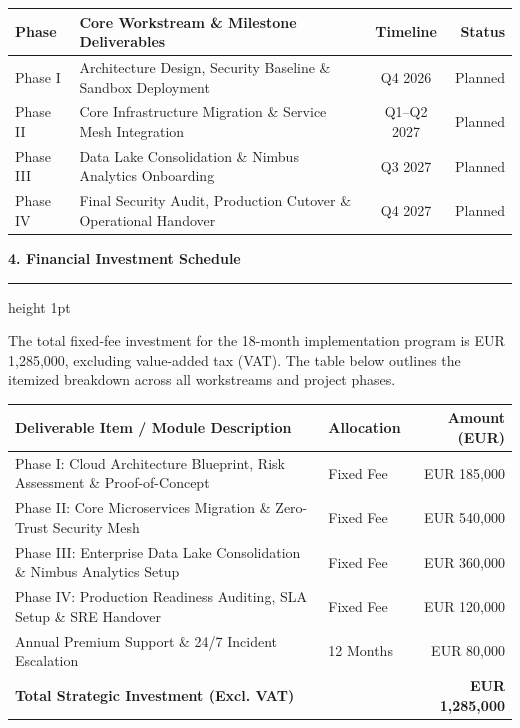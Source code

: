 \documentclass[english,11pt]{g-brief}
\newcommand{\lettersection}[1]{%
  \vspace{3.5mm}%
  {\color{NavyPrimary}\Large\bfseries #1}\par%
  \vspace{1mm}%
  {\color{SlateSecondary}\hrule height 1pt}\par%
  \vspace{2.5mm}%
}
\begin{document}
\begin{g-brief}
\vspace{2.5mm}
\begin{center}
\small
\begin{tabularx}{\textwidth}{l X c r}
\toprule
\textbf{Phase} & \textbf{Core Workstream \& Milestone Deliverables} & \textbf{Timeline} & \textbf{Status} \\
\midrule
Phase I & Architecture Design, Security Baseline \& Sandbox Deployment & Q4 2026 & Planned \\{}
Phase II & Core Infrastructure Migration \& Service Mesh Integration & Q1--Q2 2027 & Planned \\{}
Phase III & Data Lake Consolidation \& Nimbus Analytics Onboarding & Q3 2027 & Planned \\{}
Phase IV & Final Security Audit, Production Cutover \& Operational Handover & Q4 2027 & Planned \\
\bottomrule
\end{tabularx}
\end{center}

\lettersection{4. Financial Investment Schedule}

The total fixed-fee investment for the 18-month implementation program is EUR 1,285,000, excluding value-added tax (VAT). The table below outlines the itemized breakdown across all workstreams and project phases.

\vspace{2.5mm}
\begin{center}
\small
\begin{tabularx}{\textwidth}{X l r}
\toprule
\textbf{Deliverable Item / Module Description} & \textbf{Allocation} & \textbf{Amount (EUR)} \\
\midrule
Phase I: Cloud Architecture Blueprint, Risk Assessment \& Proof-of-Concept & Fixed Fee & EUR 185,000 \\{}
Phase II: Core Microservices Migration \& Zero-Trust Security Mesh & Fixed Fee & EUR 540,000 \\{}
Phase III: Enterprise Data Lake Consolidation \& Nimbus Analytics Setup & Fixed Fee & EUR 360,000 \\{}
Phase IV: Production Readiness Auditing, SLA Setup \& SRE Handover & Fixed Fee & EUR 120,000 \\{}
Annual Premium Support \& 24/7 Incident Escalation & 12 Months & EUR 80,000 \\
\midrule
\textbf{Total Strategic Investment (Excl. VAT)} & & \textbf{EUR 1,285,000} \\
\bottomrule
\end{tabularx}
\end{center}


\end{g-brief}
\end{document}
